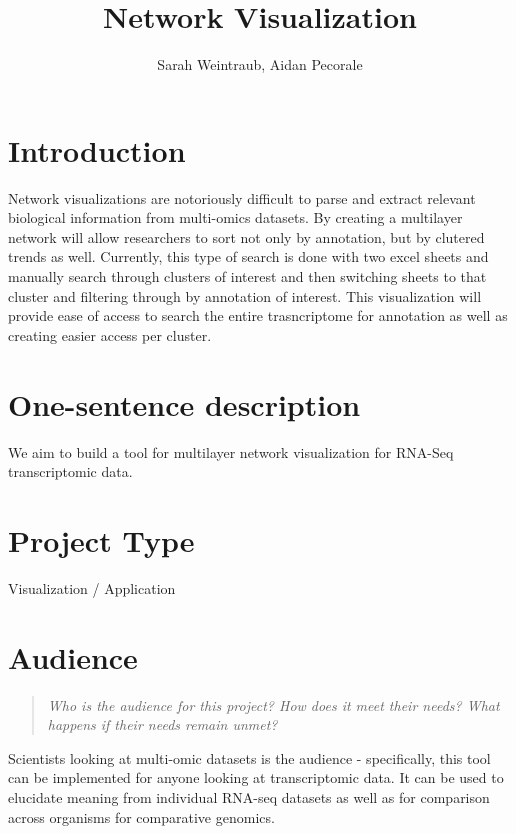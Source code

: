 \documentclass{proc}
\begin{document}
\title{Network Visualization}

\author{Sarah Weintraub, Aidan Pecorale}

\maketitle

\section{Introduction}

Network visualizations are notoriously difficult to parse and extract relevant biological information from multi-omics datasets. By creating a multilayer network will allow researchers to sort not only by annotation, but by clutered trends as well. Currently, this type of search is done with two excel sheets and manually search through clusters of interest and then switching sheets to that cluster and filtering through by annotation of interest. This visualization will provide ease of access to search the entire trasncriptome for annotation as well as creating easier access per cluster.

\section{One-sentence description}

We aim to build a tool for multilayer network visualization for RNA-Seq transcriptomic data.

\section{Project Type}

Visualization / Application

\section{Audience} 
\begin{quote}
\textit{Who is the audience for this project? 
How does it meet their needs? 
What happens if their needs remain unmet?}
\end{quote}

Scientists looking at multi-omic datasets is the audience - specifically, this tool can be implemented for anyone looking at transcriptomic data. It can be used to elucidate meaning from individual RNA-seq datasets as well as for comparison across organisms for comparative genomics. 
\end{document}
